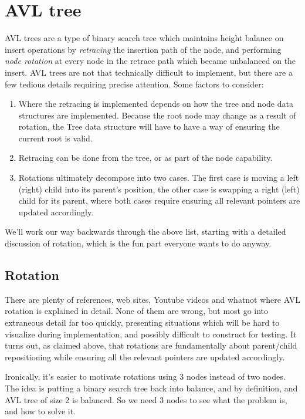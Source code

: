 \section{AVL tree}

AVL trees are a type of binary search tree which maintains height balance
on insert operations by \textit{retracing} the insertion path of the node,
and performing \textit{node rotation} at every node in the retrace path
which became unbalanced on the insert. AVL trees are not that technically
difficult to implement, but there are a few tedious details requiring
precise attention. Some factors to consider:

\begin{enumerate}
  \item Where the retracing is implemented depends on how the tree and
    node data structures are implemented. Because the root node may change
    as a result of rotation, the Tree data structure will have to have a way
    of ensuring the current root is valid.
  \item Retracing can be done from the tree, or as part of the node capability.
  \item Rotations ultimately decompose into two cases. The first case is moving
    a left (right) child into its parent's position, the other case is swapping a right (left)
    child for its parent, where both cases require ensuring all relevant pointers
    are updated accordingly.
\end{enumerate}

We'll work our way backwards through the above list, starting with a detailed
discussion of rotation, which is the fun part everyone wants to do anyway.

\subsection{Rotation}

There are plenty of references, web sites, Youtube videos and whatnot
where AVL rotation is explained in detail. None of them are wrong, but
most go into extraneous detail far too quickly, presenting situations
which will be hard to visualize during implementation, and possibly
difficult to construct for testing. It turns out, as claimed above,
that rotations are fundamentally about parent/child repositioning
while ensuring all the relevant pointers are updated accordingly.

Ironically, it's easier to motivate rotations using 3 nodes instead
of two nodes. The idea is putting a binary search tree back into
balance, and by definition, and AVL tree of size 2 is balanced.
So we need 3 nodes to see what the problem is, and how to solve it.

